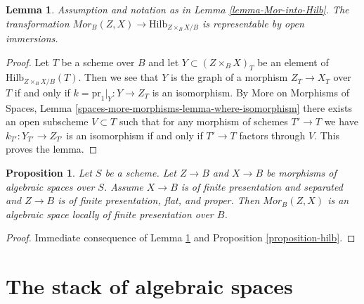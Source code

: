 \documentclass{stacks-project}
\theoremstyle{plain}
\newtheorem{proposition}[subsection]{Proposition}
\newtheorem{lemma}[subsection]{Lemma}
\theoremstyle{definition}
\theoremstyle{remark}
\numberwithin{equation}{subsection}
\def\Hilbfunctor{\mathrm{Hilb}}
\begin{document}
\begin{lemma}
\label{lemma-Mor-into-Hilb-open}
Assumption and notation as in Lemma \ref{lemma-Mor-into-Hilb}.
The transformation
$\mathit{Mor}_B(Z, X) \longrightarrow \Hilbfunctor_{Z \times_B X/B}$
is representable by open immersions.
\end{lemma}

\begin{proof}
Let $T$ be a scheme over $B$ and let $Y \subset (Z \times_B X)_T$
be an element of $\Hilbfunctor_{Z \times_B X/B}(T)$. Then we see that
$Y$ is the graph of a morphism $Z_T \to X_T$ over $T$ if and only
if $k = \text{pr}_1|_Y : Y \to Z_T$ is an isomorphism. By
More on Morphisms of Spaces, Lemma
\ref{spaces-more-morphisms-lemma-where-isomorphism}
there exists an open subscheme $V \subset T$ such that
for any morphism of schemes $T' \to T$ we have
$k_{T'} : Y_{T'} \to Z_{T'}$ is an isomorphism if and
only if $T' \to T$ factors through $V$.
This proves the lemma.
\end{proof}

\begin{proposition}
\label{proposition-Mor}
Let $S$ be a scheme. Let $Z \to B$ and $X \to B$ be morphisms of algebraic
spaces over $S$. Assume $X \to B$ is of finite presentation and separated and
$Z \to B$ is of finite presentation, flat, and proper. Then
$\mathit{Mor}_B(Z, X)$ is an algebraic space locally of finite
presentation over $B$.
\end{proposition}

\begin{proof}
Immediate consequence of
Lemma \ref{lemma-Mor-into-Hilb-open}
and Proposition \ref{proposition-hilb}.
\end{proof}








\section{The stack of algebraic spaces}
\label{section-stack-of-spaces}
\end{document}
